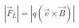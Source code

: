 \documentclass[preview]{standalone}
\begin{document}
\begin{align*}
|\vec{F}_L| = |q( \vec{v} \times \vec{B} )|
\end{align*}
\end{document}
